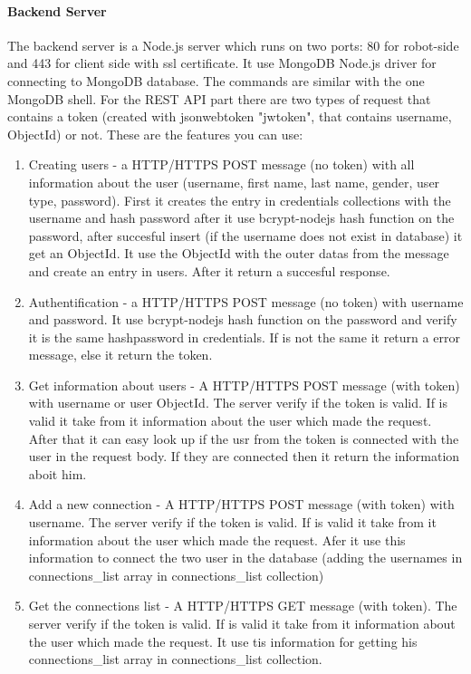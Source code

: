 \paragraph{Backend Server}
The backend server is a Node.js server which runs on two ports: 80 for robot-side and 443 for client side with ssl certificate.
It use MongoDB Node.js driver for connecting to MongoDB database. The commands are similar with the one MongoDB shell. 
For the REST API part there are two types of request that contains a token (created with jsonwebtoken "jwtoken",
that contains username, ObjectId) or not. These are the features you can use:
\begin{enumerate}
    \item Creating users - a HTTP/HTTPS POST message (no token) with all information about the user (username,
    first name, last name, gender, user type, password). First it creates
    the entry in credentials collections with the username and hash password after it use bcrypt-nodejs
    hash function on the password, after succesful insert (if the username does not exist
    in database) it get an ObjectId. It use the ObjectId with the outer datas from the message
    and create an entry in users. After it return a succesful response.
    \item Authentification - a HTTP/HTTPS POST message (no token) with username and password.
    It use bcrypt-nodejs hash function on the password and verify it is the same hashpassword in credentials.
    If is not the same it return  a error message, else it return the token.
    \item Get information about users - A HTTP/HTTPS POST message (with token) with username
    or user ObjectId. The server verify if the token is valid. If is valid it take from it information about
    the user which made the request. After that it can easy look up if the usr from the token
    is connected with the user in the request body. If they are connected then it return the information aboit him.
    \item Add a new connection - A HTTP/HTTPS POST message (with token) with username.
    The server verify if the token is valid. If is valid it take from it information about
    the user which made the request. Afer it use this information to connect the two user in
    the database (adding the usernames in connections_list array in connections_list collection)
    \item Get the connections list - A HTTP/HTTPS GET message (with token). The server verify if the
    token is valid. If is valid it take from it information about
    the user which made the request. It use tis information for getting his
    connections_list array in connections_list collection.
\end{enumerate}
